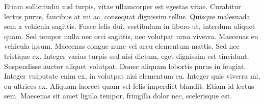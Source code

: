 Etiam sollicitudin nisl turpis, vitae ullamcorper est egestas vitae. Curabitur lectus purus, faucibus at mi ac, consequat dignissim tellus. Quisque malesuada sem a vehicula sagittis. Fusce felis dui, vestibulum in libero ut, interdum aliquet quam. Sed tempor nulla nec orci sagittis, nec volutpat urna viverra. Maecenas eu vehicula ipsum. Maecenas congue nunc vel arcu elementum mattis. Sed nec tristique ex. Integer varius turpis sed nisi dictum, eget dignissim est tincidunt. Suspendisse auctor aliquet volutpat. Donec aliquam lobortis purus in feugiat. Integer vulputate enim ex, in volutpat nisi elementum eu. Integer quis viverra mi, eu ultrices ex. Aliquam laoreet quam vel felis imperdiet blandit. Etiam id lectus sem. Maecenas sit amet ligula tempor, fringilla dolor nec, scelerisque est.
